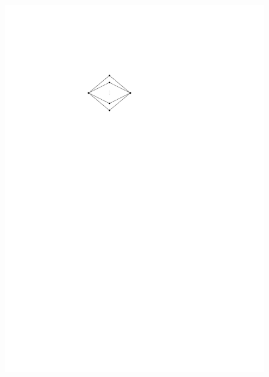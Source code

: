 \documentclass[runningheads]{llncs}
\begin{document}
\begin{figure}[htpb]
\centering
\includegraphics[scale=1]{K_2_l}

\end{figure}
\end{document}
